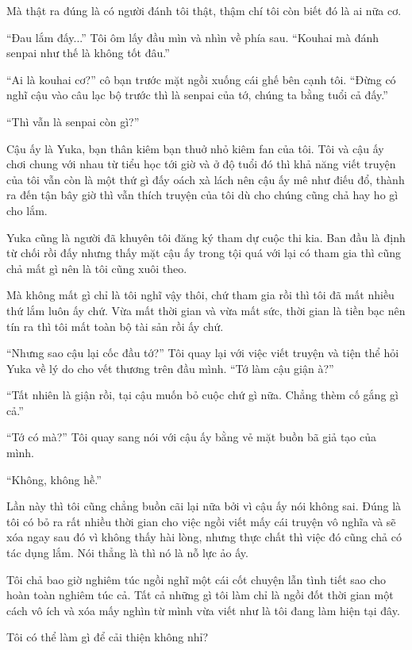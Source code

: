 {Mà thật ra đúng là có người đánh tôi thật, thậm chí tôi còn biết đó là
ai nữa cơ.

``Đau lắm đấy...'' Tôi ôm lấy đầu mìn và nhìn về phía sau. ``Kouhai mà
đánh senpai như thế là không tốt đâu.''

``Ai là kouhai cơ?'' cô bạn trước mặt ngồi xuống cái ghế bên cạnh tôi.
``Đừng có nghĩ cậu vào câu lạc bộ trước thì là senpai của tớ, chúng ta
bằng tuổi cả đấy.''

``Thì vẫn là senpai còn gì?''

Cậu ấy là Yuka, bạn thân kiêm bạn thuở nhỏ kiêm fan của tôi. Tôi và cậu
ấy chơi chung với nhau từ tiểu học tới giờ và ở độ tuổi đó thì khả năng
viết truyện của tôi vẫn còn là một thứ gì đấy oách xà lách nên cậu ấy mê
như điếu đổ, thành ra đến tận bây giờ thì vẫn thích truyện của tôi dù
cho chúng cũng chả hay ho gì cho lắm.

Yuka cũng là người đã khuyên tôi đăng ký tham dự cuộc thi kia. Ban đầu
là định từ chối rồi đấy nhưng thấy mặt cậu ấy trong tội quá với lại có
tham gia thì cũng chả mất gì nên là tôi cũng xuôi theo.

Mà không mất gì chỉ là tôi nghĩ vậy thôi, chứ tham gia rồi thì tôi đã
mất nhiều thứ lắm luôn ấy chứ. Vừa mất thời gian và vừa mất sức, thời
gian là tiền bạc nên tín ra thì tôi mất toàn bộ tài sản rồi ấy chứ.

``Nhưng sao cậu lại cốc đầu tớ?'' Tôi quay lại với việc viết truyện và
tiện thể hỏi Yuka về lý do cho vết thương trên đầu mình. ``Tớ làm cậu
giận à?''

``Tất nhiên là giận rồi, tại cậu muốn bỏ cuộc chứ gì nữa. Chẳng thèm cố
gắng gì cả.''

``Tớ có mà?'' Tôi quay sang nói với cậu ấy bằng vẻ mặt buồn bã giả tạo
của mình.

``Không, không hề.''

Lần này thì tôi cũng chẳng buồn cãi lại nữa bởi vì cậu ấy nói không sai.
Đúng là tôi có bỏ ra rất nhiều thời gian cho việc ngồi viết mấy cái
truyện vô nghĩa và sẽ xóa ngay sau đó vì không thấy hài lòng, nhưng thực
chất thì việc đó cũng chả có tác dụng lắm. Nói thẳng là thì nó là nỗ lực
ảo ấy.

Tôi chả bao giờ nghiêm túc ngồi nghĩ một cái cốt chuyện lẫn tình tiết
sao cho hoàn toàn nghiêm túc cả. Tất cả những gì tôi làm chỉ là ngồi đốt
thời gian một cách vô ích và xóa mấy nghìn từ mình vừa viết như là tôi
đang làm hiện tại đây.

Tôi có thể làm gì để cải thiện không nhỉ?

}
